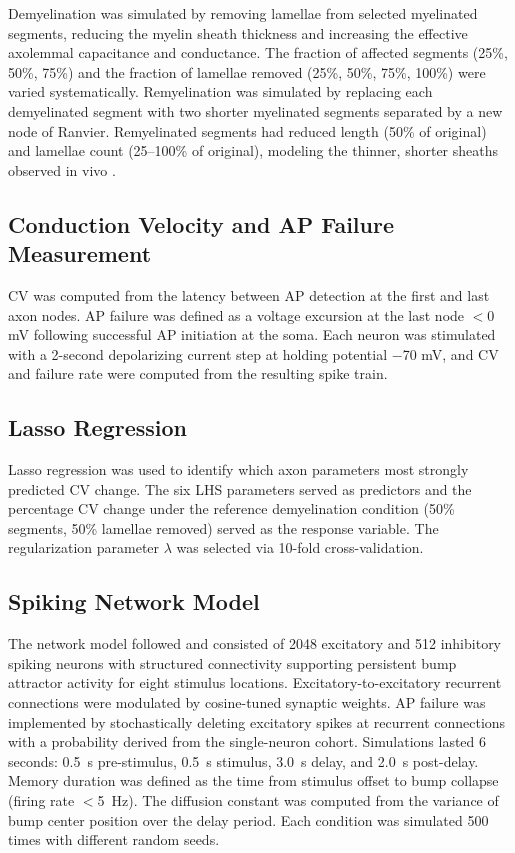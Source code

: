 \documentclass[11pt]{article}
\begin{document}
Demyelination was simulated by removing lamellae from selected myelinated segments, reducing the myelin sheath thickness and increasing the effective axolemmal capacitance and conductance. The fraction of affected segments (25\%, 50\%, 75\%) and the fraction of lamellae removed (25\%, 50\%, 75\%, 100\%) were varied systematically. Remyelination was simulated by replacing each demyelinated segment with two shorter myelinated segments separated by a new node of Ranvier. Remyelinated segments had reduced length (50\% of original) and lamellae count (25--100\% of original), modeling the thinner, shorter sheaths observed in vivo \citep{lasiene2008, powers2012}.

\subsection{Conduction Velocity and AP Failure Measurement}

CV was computed from the latency between AP detection at the first and last axon nodes. AP failure was defined as a voltage excursion at the last node $<$0 mV following successful AP initiation at the soma. Each neuron was stimulated with a 2-second depolarizing current step at holding potential $-$70 mV, and CV and failure rate were computed from the resulting spike train.

\subsection{Lasso Regression}

Lasso regression \citep{tibshirani1996} was used to identify which axon parameters most strongly predicted CV change. The six LHS parameters served as predictors and the percentage CV change under the reference demyelination condition (50\% segments, 50\% lamellae removed) served as the response variable. The regularization parameter $\lambda$ was selected via 10-fold cross-validation.

\subsection{Spiking Network Model}

The network model followed \citet{compte2000} and consisted of 2048 excitatory and 512 inhibitory spiking neurons with structured connectivity supporting persistent bump attractor activity for eight stimulus locations. Excitatory-to-excitatory recurrent connections were modulated by cosine-tuned synaptic weights. AP failure was implemented by stochastically deleting excitatory spikes at recurrent connections with a probability derived from the single-neuron cohort. Simulations lasted 6 seconds: 0.5~s pre-stimulus, 0.5~s stimulus, 3.0~s delay, and 2.0~s post-delay. Memory duration was defined as the time from stimulus offset to bump collapse (firing rate $<$5~Hz). The diffusion constant was computed from the variance of bump center position over the delay period. Each condition was simulated 500 times with different random seeds.
\end{document}
